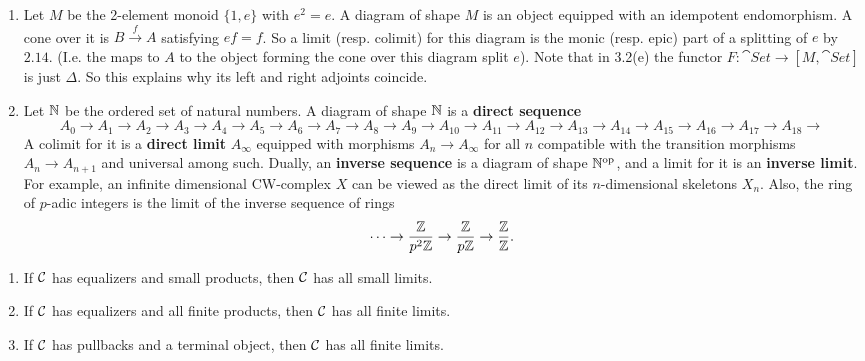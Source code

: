 \documentclass{article}
\begin{document}
\begin{exs}
\begin{enumerate}
\begin{center}
\begin{tikzcd}
                \end{tikzcd}
            \end{center}
            by first forming the product $A \times B$ and then forming the equalizer of $f\pi_{1},g\pi_{2} : A \times B \rightrightarrows C$.
        \item[(f)] Let $M$ be the 2-element monoid $\{1,e\}$ with $e^{2}=e$. A diagram of shape $M$ is an object equipped with an idempotent endomorphism. A cone over it is $B \xrightarrow{f} A$ satisfying $ef=f$. So a limit (resp. colimit) for this diagram is the monic (resp. epic) part of a splitting of $e$ by $2.14$. (I.e. the maps to $A$ to the object forming the cone over this diagram split $e$). Note that in 3.2(e) the functor $F : \cat{Set} \to [M, \cat{Set}]$ is just $\Delta$. So this explains why its left and right adjoints coincide.
        \item[(g)] Let $\mathbb{N}$ be the ordered set of natural numbers. A diagram of shape $\mathbb{N}$ is a \textbf{direct sequence} \[ A_{0} \to A_{1} \to A_{2} \to A_{3} \to A_{4} \to A_{5} \to A_{6} \to A_{7} \to A_{8} \to A_{9} \to A_{10} \to A_{11} \to A_{12} \to A_{13} \to A_{14} \to A_{15} \to A_{16} \to A_{17} \to A_{18} \to \]
        A colimit for it is a \textbf{direct limit} $A_{\infty}$ equipped with morphisms $A_{n} \to A_{\infty}$ for all $n$ compatible with the transition morphisms $A_{n} \to A_{n+1}$ and universal among such. \gap Dually, an \textbf{inverse sequence} is a diagram of shape $\mathbb{N}^{\text{op}}$, and a limit for it is an \textbf{inverse limit}. For example, an infinite dimensional CW-complex $X$ can be viewed as the direct limit of its $n$-dimensional skeletons $X_{n}$. \gap Also, the ring of $p$-adic integers is the limit of the inverse sequence of rings \[ \dots \to \frac{\mathbb{Z}}{p^{2}\mathbb{Z}} \to \frac{\mathbb{Z}}{p\mathbb{Z}} \to \frac{\mathbb{Z}}{\mathbb{Z}}. \]
    \end{enumerate}
\end{exs}
\begin{fancylem}{}
    \begin{enumerate}
        \item[(i)] If $\mathcal{C}$ has equalizers and small products, then $\mathcal{C}$ has all small limits.
        \item[(ii)] If $\mathcal{C}$ has equalizers and all finite products, then $\mathcal{C}$ has all finite limits.
        \item[(iii)] If $\mathcal{C}$ has pullbacks and a terminal object, then $\mathcal{C}$ has all finite limits.
    \end{enumerate}
\end{fancylem}
\end{document}
